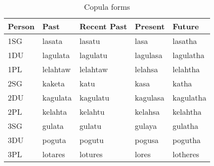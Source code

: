 \begin{table}[h!]
    \centering
    \caption{Copula forms}
    \begin{tabularx}{15cm}{|X|X|X|X|X|}
        \hline
        Person & \textbf{Past} & \textbf{Recent Past} & \textbf{Present} & \textbf{Future} \\
        \hline
        1SG & lasata & lasatu & lasa & lasatha \\
        1DU & lagulata & lagulatu & lagulasa & lagulatha \\
        1PL & lelahtaw & lelahtaw & lelahsa & lelahtha \\
        2SG & kaketa & katu & kasa & katha \\
        2DU & kagulata & kagulatu & kagulasa & kagulatha \\
        2PL & kelahta & kelahtu & kelahsa & kelahtha \\
        3SG & gulata & gulatu & gulaya & gulatha \\
        3DU & poguta & pogutu & pogusa & pogutha \\
        3PL & lotares & lotures & lores & lotheres \\
        \hline
    \end{tabularx}
\end{table}



